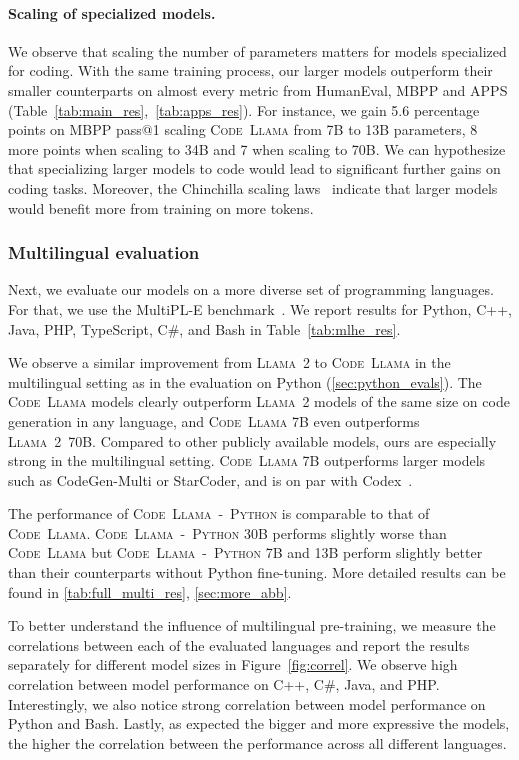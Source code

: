\paragraph{Scaling of specialized models.} We observe that scaling the number of parameters matters for models specialized for coding. With the same training process, our larger models outperform their smaller counterparts on almost every metric from HumanEval, MBPP and APPS (Table~\ref{tab:main_res},~\ref{tab:apps_res}). For instance, we gain 5.6 percentage points on MBPP pass@1 scaling \textsc{Code~Llama} from 7B to 13B parameters, 8 more points when scaling to 34B and 7 when scaling to 70B. We can hypothesize that specializing larger models to code would lead to significant further gains on coding tasks. Moreover, the Chinchilla scaling laws~\citep{hoffmann2022training} indicate that larger models would benefit more from training on more tokens. 

\subsubsection{Multilingual evaluation}
\label{sec:multilingual_evals}
Next, we evaluate our models on a more diverse set of programming languages. For that, we use the MultiPL-E benchmark~\citep{cassano2022multiple}. We report results for Python, C++, Java, PHP, TypeScript, C\#, and Bash in Table~\ref{tab:mlhe_res}.

We observe a similar improvement from \textsc{Llama~2} to \textsc{Code~Llama} in the multilingual setting as in the evaluation on Python (\ref{sec:python_evals}). The \textsc{Code~Llama} models clearly outperform \textsc{Llama~2} models of the same size on code generation in any language, and \textsc{Code~Llama} 7B even outperforms \textsc{Llama~2}~70B. 
Compared to other publicly available models, ours are especially strong in the multilingual setting. 
\textsc{Code~Llama} 7B outperforms larger models such as CodeGen-Multi or StarCoder, and is on par with Codex~\citep[code-cushman-001,][]{chen2021evaluating}.

The performance of \textsc{Code~Llama~-~Python} is comparable to that of \textsc{Code~Llama}. \textsc{Code~Llama~-~Python} 30B performs slightly worse than \textsc{Code~Llama} but \textsc{Code~Llama~-~Python} 7B and 13B perform slightly better than their counterparts without Python fine-tuning. More detailed results can be found in \ref{tab:full_multi_res}, \ref{sec:more_abb}.

To better understand the influence of multilingual pre-training, we measure the correlations between each of the evaluated languages and report the results separately for different model sizes in Figure~\ref{fig:correl}. We observe high correlation between model performance on C++, C\#, Java, and PHP. Interestingly, we also notice strong correlation between model performance on Python and Bash. Lastly, as expected the bigger and more expressive the models, the higher the correlation between the performance across all different languages.

